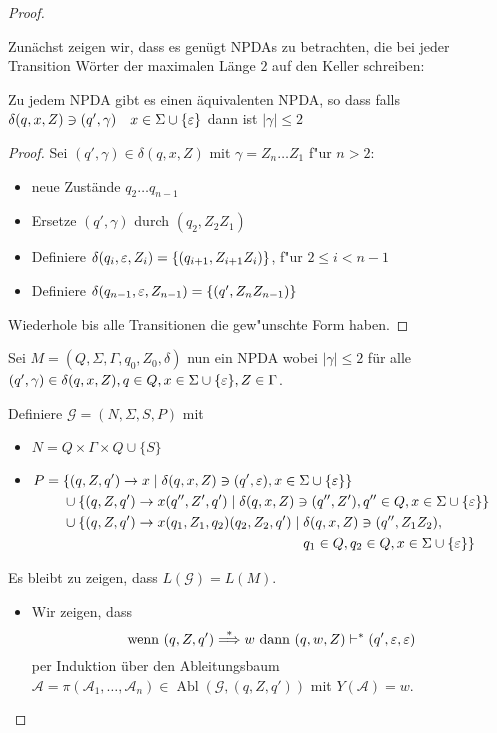 \begin{proof}
\begin{itemize}
    Zunächst zeigen wir, dass es genügt NPDAs zu betrachten, die bei jeder Transition Wörter der maximalen Länge $2$ auf den Keller schreiben:
\begin{lemma}
	Zu jedem \ac{NPDA} gibt es einen äquivalenten \ac{NPDA}, so dass
	falls $\delta(q,x,Z)\ni (q',\gamma) \quad x\in\Sigma\cup\{\varepsilon\}$
	dann ist $|\gamma| \le 2$
\end{lemma}
\begin{proof}
	Sei $(q',\gamma)\in\delta(q,x,Z)$ mit $\gamma = Z_n\dots Z_1$ f"ur $n>2$:
	\begin{itemize}
	\item 	neue Zustände $q_2\dots q_{n-1}$
	\item Ersetze $(q',\gamma)$ durch $(q_2, Z_2Z_1)$
	\item Definiere $\delta(q_i, \varepsilon, Z_i) = \{ (q_{i+1}, Z_{i+1}Z_i) \}$, f"ur $2\le i < n-1$
	\item Definiere $\delta(q_{n-1}, \varepsilon, Z_{n-1}) = \{ (q', Z_nZ_{n-1}) \}$
	\end{itemize}
	Wiederhole bis alle Transitionen die gew"unschte Form haben. \qedhere
\end{proof}

Sei $M = (Q, \Sigma, \Gamma, q_0, Z_0, \delta)$ nun ein NPDA wobei $|\gamma| \le 2$ für alle $(q', \gamma) \in \delta(q, x, Z), q \in Q, x \in \Sigma \cup \{\varepsilon\}, Z \in \Gamma$.

    Definiere $\mathcal{G} = (N, \Sigma, S, P)$ mit
    \begin{itemize}
    \item $N = Q \times \Gamma \times Q \cup \{S\}$ 
    \item $P =
      \begin{aligned}[t]
        &\{ (q, Z, q') \to x \mid \delta(q, x, Z) \ni (q', \varepsilon), x \in \Sigma \cup \{\varepsilon\} \} \\
        &\cup  \{(q, Z, q') \to x(q'', Z', q') \mid \delta(q, x, Z) \ni (q'', Z'), q'' \in Q, x \in \Sigma \cup \{\varepsilon\}\} \\
        &\cup  \{(q, Z, q') \to x(q_1,Z_1,q_2)(q_2, Z_2, q') \mid 
        \begin{aligned}[t]
          & \delta(q, x, Z) \ni (q'', Z_1Z_2), \\
          & q_1 \in Q, q_2 \in Q, x \in \Sigma \cup \{\varepsilon\} \}
        \end{aligned}
      \end{aligned}$
    \end{itemize}

    Es bleibt zu zeigen, dass $L(\mathcal{G}) = L(M)$.
    \begin{itemize}
    \item Wir zeigen, dass 
      \begin{displaymath}
        \text{wenn }(q,Z,q')\stackrel{*}{\Longrightarrow} w \text{ dann } (q,w,Z) \vdash^* (q',\varepsilon,\varepsilon)
      \end{displaymath}
      per Induktion über den Ableitungsbaum $\mathcal{A}=\pi(\mathcal{A}_1, \ldots, \mathcal{A}_n) \in \operatorname{Abl}(\mathcal{G}, (q,Z,q'))$ mit $Y(\mathcal{A}) = w$.


\end{itemize}
\end{itemize}
\end{proof}
